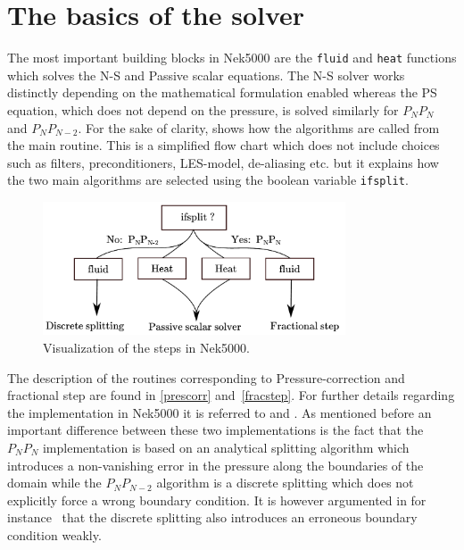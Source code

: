 \section{The basics of the solver}
The most important building blocks in Nek5000 are the \verb|fluid| and \verb|heat| functions which solves the 
N-S and Passive scalar equations. The N-S solver works distinctly depending on the mathematical formulation
enabled whereas the PS equation, which does not depend on the pressure, is solved similarly for $P_NP_N$ and $P_NP_{N-2}$. 
For the sake of clarity,  shows how the algorithms are called from the main routine.
This is a simplified flow chart which does not include choices such as filters, preconditioners, LES-model, 
de-aliasing etc. but it explains how the two main algorithms are selected using the boolean variable \verb|ifsplit|. 
%
\begin{figure}[h]
	\centering
	\includegraphics[width=0.8\textwidth]{Figures/Nek.pdf}
	\caption{Visualization of the steps in Nek5000.}
	\label{fig:files}
\end{figure}
%

The description of the routines corresponding to Pressure-correction and fractional step are found in 
\cref{prescorr} and~\ref{fracstep}. For further details regarding the 
implementation in Nek5000 it is referred to \cite{Fischer_hybridschwarz-multigrid}
and \cite{TomboulidesPnPn}. As mentioned before an important difference between these two implementations is the fact that the $P_NP_N$ 
implementation is based on an analytical splitting algorithm which introduces a non-vanishing error in the pressure along the boundaries of the 
domain while the $P_NP_{N-2}$ algorithm is a discrete splitting which does not explicitly force a wrong boundary condition.
It is however argumented in for instance~\cite{Guermond2006} that the discrete splitting also
introduces an erroneous boundary condition weakly.

